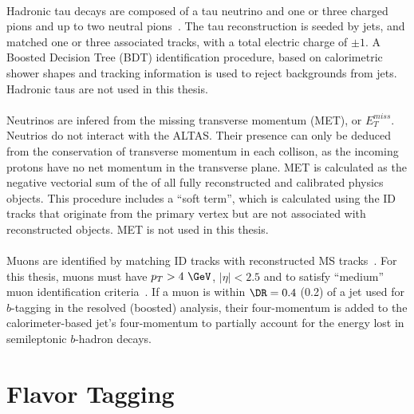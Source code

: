 \paragraph{}
Hadronic tau decays are composed of a tau neutrino and one or three charged pions and up to two neutral pions~\cite{ATLAS-CONF-2017-029}. The tau reconstruction is seeded by jets, and matched one or three associated tracks, with a total electric charge of $\pm 1$. A Boosted Decision Tree (BDT) identification procedure, based on calorimetric shower shapes and tracking information is used to reject backgrounds from jets. Hadronic taus are not used in this thesis.

\paragraph{}
Neutrinos are infered from the missing transverse momentum (MET), or $E_T^{miss}$. Neutrios do not interact with the ALTAS. Their presence can only be deduced from the conservation of transverse momentum in each collison, as the incoming protons have no net momentum in the transverse plane. MET is calculated as the negative vectorial sum of the \pt of all fully reconstructed and calibrated physics objects. This procedure includes a “soft term”, which is calculated using the ID tracks that originate from the primary vertex but are not associated with reconstructed objects. MET is not used in this thesis.

\paragraph{}
Muons are identified by matching ID tracks with reconstructed MS tracks~\cite{Aad:2016jkr}. For this thesis, muons must have $p_T > 4~\GeV$, $|\eta| < 2.5$ and to satisfy ``medium'' muon identification criteria~\cite{PERF-2015-10}. If a muon is within $\DR = 0.4$ (0.2) of a jet used for $b$-tagging in the resolved (boosted) analysis, their four-momentum is added to the calorimeter-based jet's four-momentum to partially account for the energy lost in semileptonic $b$-hadron decays. 

\section{Flavor Tagging}
